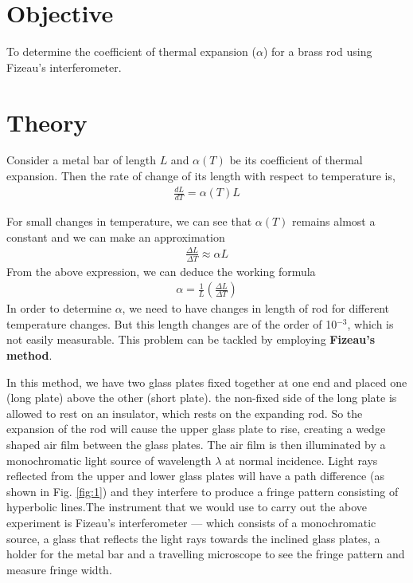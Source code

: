 \section{Objective}
To determine the coefficient of thermal expansion ($\alpha$) for a brass rod using Fizeau's
interferometer.

\section{Theory}
Consider a metal bar of length $L$ and $\alpha(T)$ be its coefficient
of thermal expansion. Then the rate of change of its length
with respect to temperature is,
\begin{align}
    \frac{dL}{dT}=\alpha(T)L
\end{align}

For small changes in temperature, we can see that $\alpha(T)$ remains almost a constant and we can make an approximation
\begin{align}
\frac{\Delta L}{\Delta T} \approx \alpha L
\end{align}
From the above expression, we can deduce the working formula
\begin{align}
    \alpha = \frac{1}{L}\left(\frac{\Delta L}{\Delta T}\right)
\end{align}
In order to determine $\alpha$, we need to have changes in length of
rod for different temperature changes. But this length changes
are of the order of 10$^{-3}$, which is not easily measurable. This
problem can be tackled by employing \textbf{Fizeau's method}.

In this method, we have two glass plates fixed together at one
end and placed one (long plate) above the other (short plate).
the non-fixed side of the long plate is allowed to rest on an
insulator, which rests on the expanding rod. So the expansion
of the rod will cause the upper glass plate to rise, creating a
wedge shaped air film between the glass plates. The air film
is then illuminated by a monochromatic light source of wavelength $\lambda$ at normal incidence. Light rays reflected from the
upper and lower glass plates will have a path difference (as
shown in Fig. \ref{fig:1}) and they interfere to produce a fringe pattern
consisting of hyperbolic lines.The instrument that we would
use to carry out the above experiment is Fizeau's interferometer --- which consists of a monochromatic source, a glass that
reflects the light rays towards the inclined glass plates, a holder
for the metal bar and a travelling microscope to see the fringe
pattern and measure fringe width.

